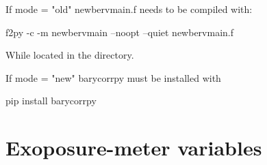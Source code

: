 \begin{itemize}
\ifdevguide

\begin{note}
If mode = "old" newbervmain.f needs to be compiled with:
\begin{cmdbox}
f2py -c -m newbervmain --noopt --quiet newbervmain.f
\end{cmdbox}
While located in the  directory.
\end{note}

\begin{note}
If mode = "new" barycorrpy must be installed with
\begin{cmdbox}
pip install barycorrpy
\end{cmdbox}
\end{note}

\fi

\end{itemize}


\clearpage
\newpage
\section{Exoposure-meter variables}
\label{ch:variables:exopsuremeter}

